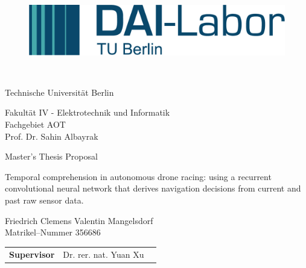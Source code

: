 \thispagestyle{empty}
\begin{figure}[htbp]
	\centering
 \begin{minipage}[b]{41 mm}
   \includegraphics[width=40 mm]{figures/DAI_Logo.png}
 \end{minipage}
\end{figure}

~\vspace{0.5cm}

\begin{center}
\begin{Huge}
Technische Universit\"at Berlin\\
\vspace{1mm}
\end{Huge}{\Large Fakult\"at IV - Elektrotechnik und Informatik\\
Fachgebiet AOT\\
Prof. Dr. Sahin Albayrak}\\

\vspace{26mm}
\begin{LARGE}
Master's Thesis Proposal\\
\end{LARGE}
\vspace{8mm}
\begin{LARGE}
Temporal comprehension in autonomous drone racing:
using a recurrent convolutional neural network that derives navigation decisions from current and past raw sensor data.\\
\end{LARGE}
\vspace{3 cm}
Friedrich Clemens Valentin Mangelsdorf\\
Matrikel--Nummer 356686\\
\vspace{1cm}
\begin{tabular}{lll}
\textbf{Supervisor} & Dr. rer. nat. Yuan Xu \\%
\end{tabular}

\end{center}

